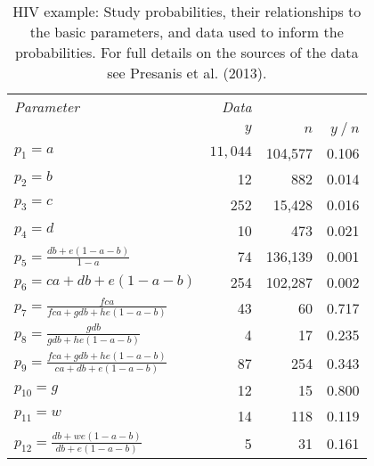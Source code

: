 \begin{table}
\centering
\caption{\label{tab:HIV-data}HIV example: Study probabilities, their relationships to the basic parameters, and data used to inform the probabilities. For full details on the sources of the data see Presanis et al. (2013).}
\begin{tabular}{p{4cm}rrr}
\toprule
\em Parameter & \em Data & & \\ 
 & \em $y$ & \em $n$ & \em $y \mathop{/} n$ \\ 
\midrule
  $p_1 = a$ & $11,044$ & 104,577 & 0.106 \\[8pt] 
  $p_2 = b$ & 12 & 882 & 0.014 \\[8pt] 
  $p_3 = c$ & 252 & 15,428 & 0.016 \\[8pt] 
  $p_4 = d$ & 10 & 473 & 0.021 \\[8pt] 
  $p_5 = \frac{db + e(1-a-b)}{1-a}$ & 74 & 136,139 & 0.001 \\[8pt] 
  $p_6 = ca + db + e(1-a-b)$ & 254 & 102,287 & 0.002 \\[8pt] 
  $p_7 = \frac{fca}{fca + gdb + he(1-a-b)}$ & 43 & 60 & 0.717 \\[8pt] 
  $p_8 = \frac{gdb}{gdb + he(1-a-b)}$ & 4 & 17 & 0.235 \\[8pt] 
  $p_9 = \frac{fca+gdb+he(1-a-b)}{ca + db + e(1-a-b)}$ & 87 & 254 & 0.343 \\[8pt] 
  $p_{10} = g$ & 12 & 15 & 0.800 \\[8pt] 
  $p_{11} = w$ & 14 & 118 & 0.119 \\[8pt] 
  $p_{12} = \frac{db + we(1-a-b)}{db + e(1-a-b)}$ & 5 & 31 & 0.161 \\ 
\bottomrule
\end{tabular}
\end{table}